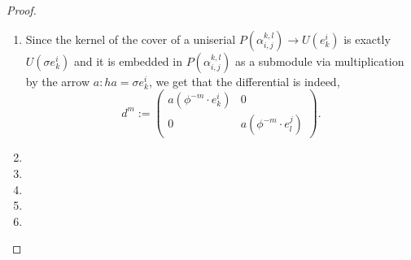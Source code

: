 \documentclass[11pt,oneside]{amsbook}
\numberwithin{equation}{section}
\theoremstyle{plain}
\theoremstyle{definition}
\theoremstyle{remark}
\DeclareMathOperator{\lcm}{\mathrm{lcm}}
\newcommand{\cO}{\mathcal{O}}
\begin{document}
\begin{proof}
\begin{enumerate}
			$P^m$ in the resolution are
			\[ P(\phi^{-m} \sigma e^i_k) \oplus P(\phi^{-m}\sigma e^j_l). \]
			So the terms have indecomposable direct summands which cycle through the orbit of $e^i_k$ and $e^j_l$ under the 
			action of $\phi$. The orbits are anit-cycle in $I$, and the place at which the two cycle meet up at $\alpha_{i,j}^{k,l} 
			= (e^i_k, e^j_l)$ is exactly $p = \lcm\{|\cO_{\phi}(e^i_k)|, |\cO_{\phi}(e^j_l)|$.
			\item Since the kernel of the cover of a uniserial $P(\alpha_{i,j}^{k,l}) \to U(e^i_k)$ is exactly $U(\sigma e^i_k)$ and 
			it is embedded in $P(\alpha_{i,j}^{k,l})$ as a submodule via multiplication by the arrow $a: ha=\sigma e^i_k$, we 
			get that the differential is indeed, 
			\[ d^m:= \begin{pmatrix}
				a(\phi^{-m}\cdot e^i_k)  & 0 \\
				0 & a(\phi^{-m} \cdot e^j_l)
			\end{pmatrix}. \]
			\item 
			\item 
			\item 
			\item
			\item 
		\end{enumerate}
	\end{proof}
	
	
	
	
	
\end{document}
